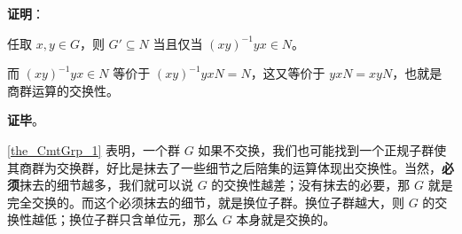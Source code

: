 \textbf{证明}：

任取 $x, y\in G$，则 $G'\subseteq N$ 当且仅当 $(xy)^{-1}yx\in N$。

而 $(xy)^{-1}yx\in N$ 等价于 $(xy)^{-1}yxN=N$，这又等价于 $yxN=xyN$，也就是商群运算的交换性。



\textbf{证毕}。

\autoref{the_CmtGrp_1} 表明，一个群 $G$ 如果不交换，我们也可能找到一个正规子群使其商群为交换群，好比是抹去了一些细节之后陪集的运算体现出交换性。当然，\textbf{必须}抹去的细节越多，我们就可以说 $G$ 的交换性越差；没有抹去的必要，那 $G$ 就是完全交换的。而这个必须抹去的细节，就是换位子群。换位子群越大，则 $G$ 的交换性越低；换位子群只含单位元，那么 $G$ 本身就是交换的。












